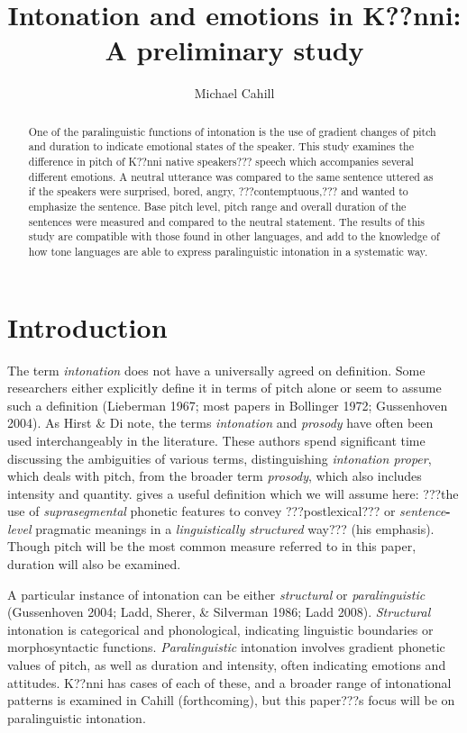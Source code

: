 \documentclass[output=paper]{langsci/langscibook}
\title{Intonation and emotions in {K??nni}: {A} preliminary study}  (Gur)
\author{%
 Michael Cahill\affiliation{Cahill affiliation} 
}
\begin{document}
\begin{abstract}
One of the paralinguistic functions of intonation is the use of gradient changes of pitch and duration to indicate emotional states of the speaker. This study examines the difference in pitch of K??nni native speakers??? speech which accompanies several different emotions. A neutral utterance was compared to the same sentence uttered as if the speakers were surprised, bored, angry, ???contemptuous,??? and wanted to emphasize the sentence. Base pitch level, pitch range and overall duration of the sentences were measured and compared to the neutral statement. The results of this study are compatible with those found in other languages, and add to the knowledge of how tone languages are able to express paralinguistic intonation in a systematic way.
\end{abstract}

\section{Introduction}

The term \emph{intonation} does not have a universally agreed on definition. Some researchers either explicitly define it in terms of pitch alone or seem to assume such a definition (Lieberman 1967; most papers in Bollinger 1972; Gussenhoven 2004). As Hirst \& Di\citet[3]{Canio1998} note, the terms \emph{intonation} and \emph{prosody} have often been used interchangeably in the literature. These authors spend significant time discussing the ambiguities of various terms, distinguishing \emph{intonation proper}, which deals with pitch, from the broader term \emph{prosody},\emph{ }which also includes intensity and quantity. \citet[4]{Ladd2008} gives a useful definition which we will assume here: ???the use of \emph{suprasegmental} phonetic features to convey ???postlexical??? or \emph{sentence}\textbf{{}-}\emph{level}\textbf{ }pragmatic meanings in a \emph{linguistically}\textbf{ }\emph{structured}\textbf{ }way??? (his emphasis). Though pitch will be the most common measure referred to in this paper, duration will also be examined. 


A particular instance of intonation can be either \emph{structural} or \emph{paralinguistic} (Gussenhoven 2004; Ladd, Sherer, \& Silverman 1986; Ladd 2008). \emph{Structural} intonation is categorical and phonological, indicating linguistic boundaries or morphosyntactic functions. \emph{Paralinguistic} intonation involves gradient phonetic values of pitch, as well as duration and intensity, often indicating emotions and attitudes. K??nni has cases of each of these, and a broader range of intonational patterns is examined in Cahill (forthcoming), but this paper???s focus will be on paralinguistic intonation.
\end{document}
